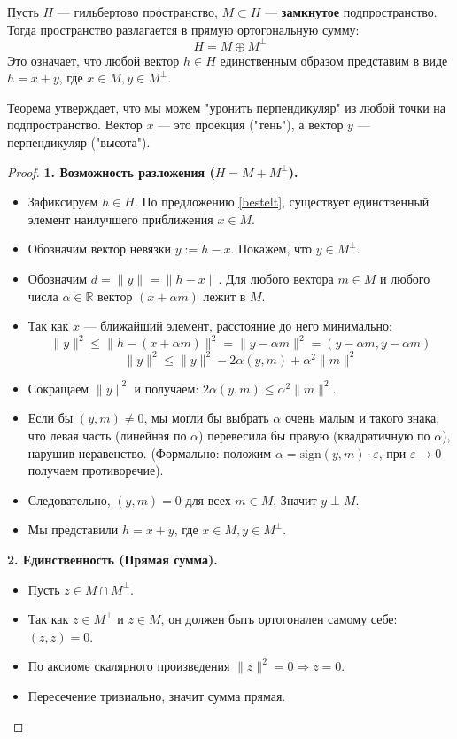 \begin{theorem}\label{thm4.3}
	Пусть $H$ --- гильбертово пространство, $M \subset H$ --- \textbf{замкнутое} подпространство. Тогда пространство разлагается в прямую ортогональную сумму:
	\[ H = M \oplus M^\perp \]
	Это означает, что любой вектор $h \in H$ единственным образом представим в виде $h = x + y$, где $x \in M, y \in M^\perp$.
\end{theorem}

\begin{idea}
	Теорема утверждает, что мы можем "уронить перпендикуляр" из любой точки на подпространство. Вектор $x$ — это проекция ("тень"), а вектор $y$ — перпендикуляр ("высота").
\end{idea}


\begin{proof}
	\textbf{1. Возможность разложения ($H = M + M^\perp$).}
	\begin{itemize}
		\item Зафиксируем $h \in H$. По предложению \ref{bestelt}, существует единственный элемент наилучшего приближения $x \in M$.
		\item Обозначим вектор невязки $y := h - x$. Покажем, что $y \in M^\perp$.
		\item Обозначим $d = \|y\| = \|h - x\|$. Для любого вектора $m \in M$ и любого числа $\alpha \in \mathbb{R}$ вектор $(x + \alpha m)$ лежит в $M$.
		\item Так как $x$ — ближайший элемент, расстояние до него минимально:
		\[ \|y\|^2 \leqslant \|h - (x + \alpha m)\|^2 = \|y - \alpha m\|^2 = (y - \alpha m, y - \alpha m) \]
		\[ \|y\|^2 \leqslant \|y\|^2 - 2\alpha(y, m) + \alpha^2\|m\|^2 \]
		\item Сокращаем $\|y\|^2$ и получаем: $2\alpha(y, m) \leqslant \alpha^2\|m\|^2$.
		\item Если бы $(y, m) \neq 0$, мы могли бы выбрать $\alpha$ очень малым и такого знака, что левая часть (линейная по $\alpha$) перевесила бы правую (квадратичную по $\alpha$), нарушив неравенство. (Формально: положим $\alpha = \text{sign}(y,m) \cdot \varepsilon$, при $\varepsilon \to 0$ получаем противоречие).
		\item Следовательно, $(y, m) = 0$ для всех $m \in M$. Значит $y \perp M$.
		\item Мы представили $h = x + y$, где $x \in M, y \in M^\perp$.
	\end{itemize}
	
	\textbf{2. Единственность (Прямая сумма).}
	\begin{itemize}
		\item Пусть $z \in M \cap M^\perp$.
		\item Так как $z \in M^\perp$ и $z \in M$, он должен быть ортогонален самому себе: $(z, z) = 0$.
		\item По аксиоме скалярного произведения $\|z\|^2 = 0 \Rightarrow z = 0$.
		\item Пересечение тривиально, значит сумма прямая.
	\end{itemize}
\end{proof}

